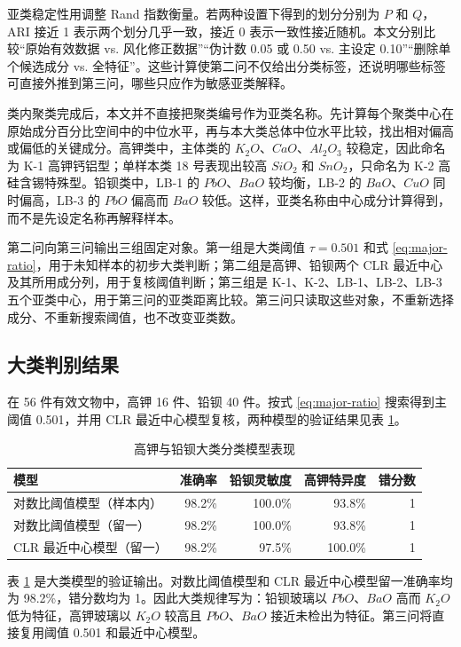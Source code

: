 \documentclass[UTF8,zihao=-4,a4paper,fontset=fandol]{ctexart}
\begin{document}
亚类稳定性用调整 Rand 指数衡量。若两种设置下得到的划分分别为 $P$ 和 $Q$，ARI 接近 1 表示两个划分几乎一致，接近 0 表示一致性接近随机。本文分别比较“原始有效数据 vs. 风化修正数据”“伪计数 0.05 或 0.50 vs. 主设定 0.10”“删除单个候选成分 vs. 全特征”。这些计算使第二问不仅给出分类标签，还说明哪些标签可直接外推到第三问，哪些只应作为敏感亚类解释。

类内聚类完成后，本文并不直接把聚类编号作为亚类名称。先计算每个聚类中心在原始成分百分比空间中的中位水平，再与本大类总体中位水平比较，找出相对偏高或偏低的关键成分。高钾类中，主体类的 $K_2O$、$CaO$、$Al_2O_3$ 较稳定，因此命名为 K-1 高钾钙铝型；单样本类 18 号表现出较高 $SiO_2$ 和 $SnO_2$，只命名为 K-2 高硅含锡特殊型。铅钡类中，LB-1 的 $PbO$、$BaO$ 较均衡，LB-2 的 $BaO$、$CuO$ 同时偏高，LB-3 的 $PbO$ 偏高而 $BaO$ 较低。这样，亚类名称由中心成分计算得到，而不是先设定名称再解释样本。

第二问向第三问输出三组固定对象。第一组是大类阈值 $\tau=0.501$ 和式 \eqref{eq:major-ratio}，用于未知样本的初步大类判断；第二组是高钾、铅钡两个 CLR 最近中心及其所用成分列，用于复核阈值判断；第三组是 K-1、K-2、LB-1、LB-2、LB-3 五个亚类中心，用于第三问的亚类距离比较。第三问只读取这些对象，不重新选择成分、不重新搜索阈值，也不改变亚类数。

\subsection{大类判别结果}

在 56 件有效文物中，高钾 16 件、铅钡 40 件。按式 \eqref{eq:major-ratio} 搜索得到主阈值 0.501，并用 CLR 最近中心模型复核，两种模型的验证结果见表 \ref{tab:q2-major}。

\begin{table}[H]
  \centering
  \caption{高钾与铅钡大类分类模型表现}
  \label{tab:q2-major}
  \begin{tabular}{lrrrr}
    \toprule
    模型 & 准确率 & 铅钡灵敏度 & 高钾特异度 & 错分数 \\
    \midrule
    对数比阈值模型（样本内） & 98.2\% & 100.0\% & 93.8\% & 1 \\
    对数比阈值模型（留一） & 98.2\% & 100.0\% & 93.8\% & 1 \\
    CLR 最近中心模型（留一） & 98.2\% & 97.5\% & 100.0\% & 1 \\
    \bottomrule
  \end{tabular}
\end{table}

表 \ref{tab:q2-major} 是大类模型的验证输出。对数比阈值模型和 CLR 最近中心模型留一准确率均为 98.2\%，错分数均为 1。因此大类规律写为：铅钡玻璃以 $PbO$、$BaO$ 高而 $K_2O$ 低为特征，高钾玻璃以 $K_2O$ 较高且 $PbO$、$BaO$ 接近未检出为特征。第三问将直接复用阈值 0.501 和最近中心模型。
\end{document}
